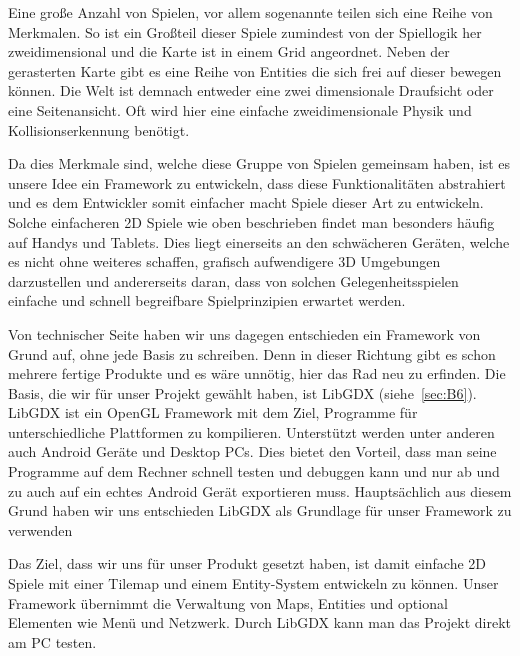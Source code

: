 Eine große Anzahl von Spielen, vor allem sogenannte  teilen sich eine Reihe von Merkmalen.
So ist ein Großteil dieser Spiele zumindest von der Spiellogik her zweidimensional und die Karte ist in einem Grid angeordnet. Neben der gerasterten Karte gibt es eine Reihe von Entities die sich frei auf dieser bewegen können. Die Welt ist demnach entweder eine zwei dimensionale Draufsicht oder eine Seitenansicht. Oft wird hier eine einfache zweidimensionale Physik und Kollisionserkennung benötigt.

Da dies Merkmale sind, welche diese Gruppe von Spielen gemeinsam haben, ist es unsere Idee ein Framework zu entwickeln, dass diese Funktionalitäten abstrahiert und es dem Entwickler somit einfacher macht Spiele dieser Art zu entwickeln.
Solche einfacheren 2D Spiele wie oben beschrieben findet man besonders häufig auf Handys und Tablets. Dies liegt einerseits an den schwächeren Geräten, welche es nicht ohne weiteres schaffen, grafisch aufwendigere 3D Umgebungen darzustellen und andererseits daran, dass von solchen Gelegenheitsspielen einfache und schnell begreifbare Spielprinzipien erwartet werden.

Von technischer Seite haben wir uns dagegen entschieden ein Framework von Grund auf, ohne jede Basis zu schreiben. Denn in dieser Richtung gibt es schon mehrere fertige Produkte und es wäre unnötig, hier das Rad neu zu erfinden. 
Die Basis, die wir für unser Projekt gewählt haben, ist LibGDX (siehe~\ref{sec:B6}). LibGDX ist ein OpenGL Framework mit dem Ziel, Programme für unterschiedliche Plattformen zu kompilieren. Unterstützt werden unter anderen auch Android Geräte und Desktop PCs. Dies bietet den Vorteil, dass man seine Programme auf dem Rechner schnell testen und debuggen kann und nur ab und zu auch auf ein echtes Android Gerät exportieren muss. Hauptsächlich aus diesem Grund haben wir uns entschieden LibGDX als Grundlage für unser Framework zu verwenden

Das Ziel, dass wir uns für unser Produkt gesetzt haben, ist damit einfache 2D Spiele mit einer Tilemap und einem Entity-System entwickeln zu können. Unser Framework übernimmt die Verwaltung von Maps, Entities und optional Elementen wie Menü und Netzwerk. Durch LibGDX kann man das Projekt direkt am PC testen.